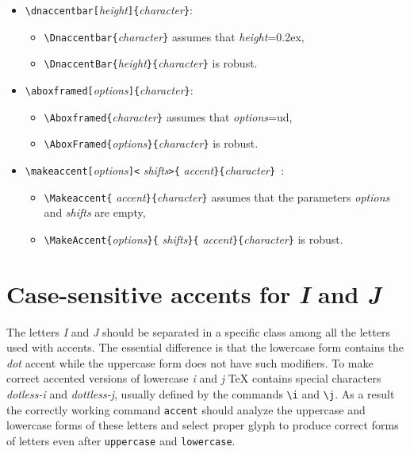 \begin{itemize}
\begin{itemize}
        \item
        \verb?\UpaccentBar{?{\em height}\verb?}{?{\em character}\verb?}?
        is robust.
        \end{itemize}
\item \verb?\dnaccentbar[?{\em height}\verb?]{?{\em character}\verb?}?:
        \begin{itemize}
        \item
        \verb?\Dnaccentbar{?{\em character}\verb?}?
        assumes that {\em height}=\textsf{0.2ex},
        \item
        \verb?\DnaccentBar{?{\em height}\verb?}{?{\em character}\verb?}?
        is robust.
        \end{itemize}
\item \verb?\aboxframed[?{\em options}\verb?]{?{\em character}\verb?}?:
        \begin{itemize}
        \item
        \verb?\Aboxframed{?{\em character}\verb?}?
        assumes that {\em options}=\textsf{ud},
        \item
        \verb?\AboxFramed{?{\em options}\verb?}{?{\em character}\verb?}?
        is robust.
        \end{itemize}
\item \verb?\makeaccent[?{\em options}\verb?]<?%
             {\em shifts}\verb?>{?%
             {\em accent}\verb?}{?{\em character}\verb?}?~:
        \begin{itemize}
        \item
        \verb?\Makeaccent{?%
             {\em accent}\verb?}{?{\em character}\verb?}?
        assumes that the parameters
        {\em options} and {\em shifts} are empty,
        \item
        \verb?\MakeAccent{?{\em options}\verb?}{?%
             {\em shifts}\verb?}{?%
             {\em accent}\verb?}{?{\em character}\verb?}?
        is robust.
        \end{itemize}
\end{itemize}

\section{Case-sensitive accents for {\sl I}
         and {\sl J}\label{S-IJ}}

The letters {\sl I} and {\sl J} should be separated in a
specific class among all the letters used with accents.
The essential difference is that the lowercase form contains the
{\em dot} accent while the uppercase form does not have such modifiers.
To make correct accented versions of lowercase {\sl i} and {\sl j}
\TeX{} contains special characters {\sl dotless-i} and
{\sl dottless-j}, usually defined by the commands \verb?\i? and \verb?\j?.
As a result the correctly working command {\tt\bs{}accent} should
analyze the uppercase and lowercase forms of these letters and select
proper glyph to produce correct forms of letters even after
{\tt\bs{}uppercase} and {\tt\bs{}lowercase}.

